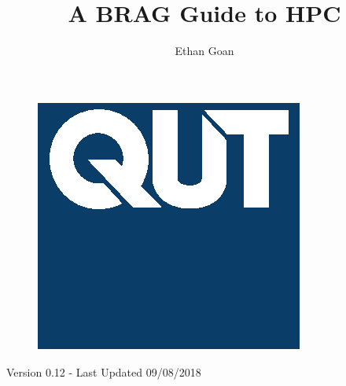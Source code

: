 \documentclass[oneside]{article}
\begin{document}
 
%
\pagestyle{main}
%
%
%
\title{A BRAG Guide to HPC}
\date{}
\author{Ethan Goan}
\maketitle
\begin{figure}[!h]
  \centering
  \includegraphics[scale=0.5]{./figs/qut.eps}
\end{figure}
\begin{center}
  Version 0.12 - Last Updated 09/08/2018
\end{center}
\tableofcontents
%
\newpage
%

%
\newpage

%
%

%
%

%
\newpage

\newpage
%

%
\newpage
\printbibliography
%
%
\newpage
%
%

\end{document}
